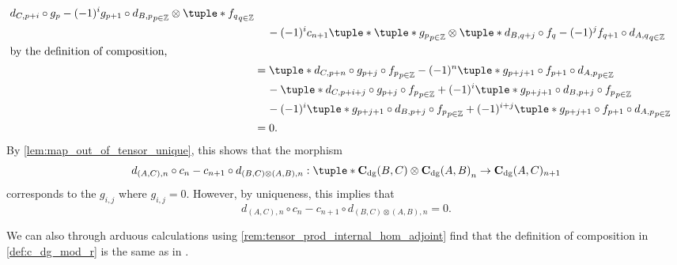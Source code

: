 \begin{remark}
\begin{enumerate}
{\begin{align*}
{{                        d_{C, p + i} \circ g_p - (-1)^i g_{p + 1} \circ d_{B, p}
                    }_{p \in \Zb} \otimes \tuple*{ f_q }_{q \in \Zb}
                } \\
                &\hspace{0.4cm} - (-1)^i c_{n + 1} \tuple*{
                    \tuple*{ g_p }_{p \in \Zb} \otimes \tuple*{
                        d_{B, q + j} \circ f_q - (-1)^j f_{q + 1} \circ d_{A, q}
                    }_{q \in \Zb}
                } \\
                \intertext{by the definition of composition,}
                &= \tuple*{
                    d_{C, p + n} \circ g_{p + j} \circ f_p
                }_{p \in \Zb} - (-1)^n \tuple*{
                    g_{p + j + 1} \circ f_{p + 1} \circ d_{A, p}
                }_{p \in \Zb} \\
                &\hspace{0.4cm} - \tuple*{
                    d_{C, p + i + j} \circ g_{p + j} \circ f_p
                }_{p \in \Zb} + (-1)^i \tuple*{
                    g_{p + j + 1} \circ d_{B, p + j} \circ f_p
                }_{p \in \Zb} \\
                &\hspace{0.4cm} - (-1)^i \tuple*{
                    g_{p + j + 1} \circ d_{B, p + j} \circ f_p
                }_{p \in \Zb} + (-1)^{i + j} \tuple*{
                    g_{p + j + 1} \circ f_{p + 1} \circ d_{A, p}
                }_{p \in \Zb} \\
                &= 0.
            \end{align*}
            By \autoref{lem:map_out_of_tensor_unique}, this shows that the morphism
            \[
                d_{(A, C), n} \circ c_n - c_{n + 1} \circ d_{(B, C) \otimes (A, B), n}: \\
                \tuple*{ \C_{\dg}(B, C) \otimes \C_{\dg}(A, B) }_n \to \C_{\dg}(A, C)_{n + 1}
            \]         
            corresponds to the \( g_{i,j} \) where \( g_{i, j} = 0 \). However, by uniqueness, this implies that
            \[
                d_{(A, C), n} \circ c_n - c_{n + 1} \circ d_{(B, C) \otimes (A, B), n} = 0.
            \]
        }
    \end{enumerate}
\end{remark}

We can also through arduous calculations using \autoref{rem:tensor_prod_internal_hom_adjoint} find that the definition of composition in \autoref{def:c_dg_mod_r} is the same as in \cite[p.\ 295]{Borceux_1994}.


